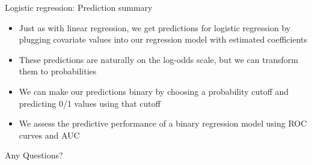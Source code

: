 \documentclass[10pt,t]{beamer}
\begin{document}
\begin{frame}{Logistic regression: Prediction summary}
	\begin{itemize}
		\item Just as with linear regression, we get predictions for logistic regression by plugging covariate values into our regression model with estimated coefficients  
		
		\medskip
		
		\item These predictions are naturally on the log-odds scale, but we can transform them to probabilities 
		
		\medskip
		
		\item We can make our predictions binary by choosing a probability cutoff and predicting 0/1 values using that cutoff 
		
		\medskip
		 
		\item We assess the predictive performance of a binary regression model using ROC curves and AUC
	\end{itemize}
\end{frame}
%
%
%



\begin{frame}[c]
	\centering \huge Any Questions?
\end{frame}
\end{document}
